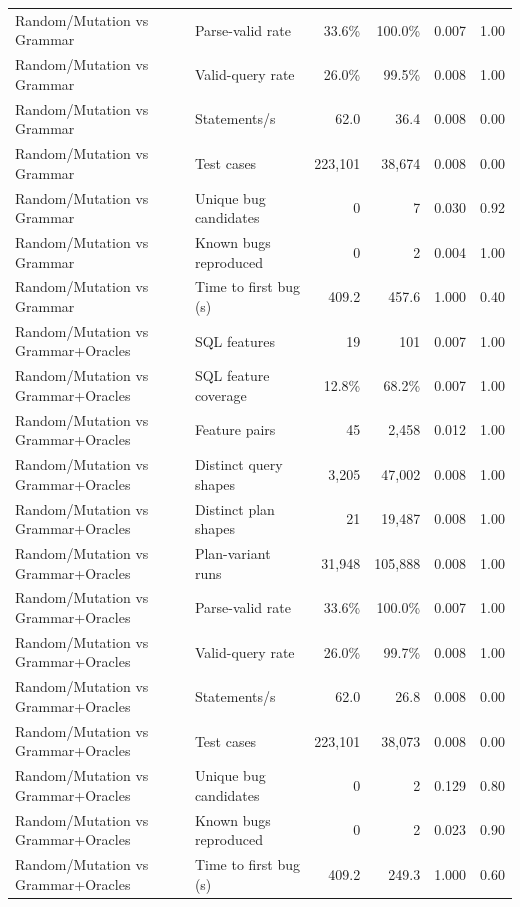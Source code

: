 \begin{table}[t]
\begin{tabular}{llrrrr}
    Random/Mutation vs Grammar & Parse-valid rate & 33.6\% & 100.0\% & 0.007 & 1.00 \\
    Random/Mutation vs Grammar & Valid-query rate & 26.0\% & 99.5\% & 0.008 & 1.00 \\
    Random/Mutation vs Grammar & Statements/s & 62.0 & 36.4 & 0.008 & 0.00 \\
    Random/Mutation vs Grammar & Test cases & 223{,}101 & 38{,}674 & 0.008 & 0.00 \\
    Random/Mutation vs Grammar & Unique bug candidates & 0 & 7 & 0.030 & 0.92 \\
    Random/Mutation vs Grammar & Known bugs reproduced & 0 & 2 & 0.004 & 1.00 \\
    Random/Mutation vs Grammar & Time to first bug (s) & 409.2 & 457.6 & 1.000 & 0.40 \\
    Random/Mutation vs Grammar+Oracles & SQL features & 19 & 101 & 0.007 & 1.00 \\
    Random/Mutation vs Grammar+Oracles & SQL feature coverage & 12.8\% & 68.2\% & 0.007 & 1.00 \\
    Random/Mutation vs Grammar+Oracles & Feature pairs & 45 & 2{,}458 & 0.012 & 1.00 \\
    Random/Mutation vs Grammar+Oracles & Distinct query shapes & 3{,}205 & 47{,}002 & 0.008 & 1.00 \\
    Random/Mutation vs Grammar+Oracles & Distinct plan shapes & 21 & 19{,}487 & 0.008 & 1.00 \\
    Random/Mutation vs Grammar+Oracles & Plan-variant runs & 31{,}948 & 105{,}888 & 0.008 & 1.00 \\
    Random/Mutation vs Grammar+Oracles & Parse-valid rate & 33.6\% & 100.0\% & 0.007 & 1.00 \\
    Random/Mutation vs Grammar+Oracles & Valid-query rate & 26.0\% & 99.7\% & 0.008 & 1.00 \\
    Random/Mutation vs Grammar+Oracles & Statements/s & 62.0 & 26.8 & 0.008 & 0.00 \\
    Random/Mutation vs Grammar+Oracles & Test cases & 223{,}101 & 38{,}073 & 0.008 & 0.00 \\
    Random/Mutation vs Grammar+Oracles & Unique bug candidates & 0 & 2 & 0.129 & 0.80 \\
    Random/Mutation vs Grammar+Oracles & Known bugs reproduced & 0 & 2 & 0.023 & 0.90 \\
    Random/Mutation vs Grammar+Oracles & Time to first bug (s) & 409.2 & 249.3 & 1.000 & 0.60 \\
    \bottomrule
  \end{tabular}
\end{table}
